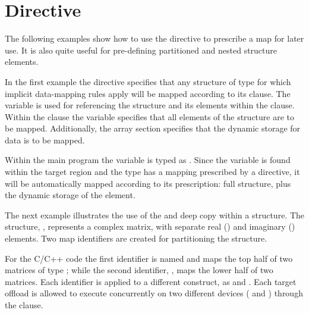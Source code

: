 \pagebreak
\section{ Directive}
\label{sec:declare_mapper}

The following examples show how to use the 
directive to prescribe a map for later use.
It is also quite useful for pre-defining partitioned and nested 
structure elements.

In the first example the  directive specifies 
that any structure of type  for which implicit data-mapping
rules apply will be mapped according to its  clause.
The variable  is used for referencing the structure and its 
elements within the  clause. 
Within the  clause the  variable specifies that all
elements of the structure are to be mapped.  Additionally, the
array section  specifies that the dynamic 
storage for data is to be mapped. 

Within the main program the  variable is typed as .
Since the variable is found within the target region and the type has a mapping prescribed by
a  directive, it will be automatically mapped according to its prescription: 
full structure, plus the dynamic storage of the  element. 




{}
The next example illustrates the use of the  and deep copy within a structure. 
The structure, ,  represents a complex matrix, 
with separate real () and imaginary () elements.
Two map identifiers are created for partitioning the  structure.

For the C/C++ code the first identifier is named  and maps the top half of
two matrices of type ; while the second identifier, ,
maps the lower half of two matrices. 
Each identifier is applied to a different  construct,
as   
and .
Each target offload is allowed to execute concurrently on two different devices 
( and ) through the  clause.

